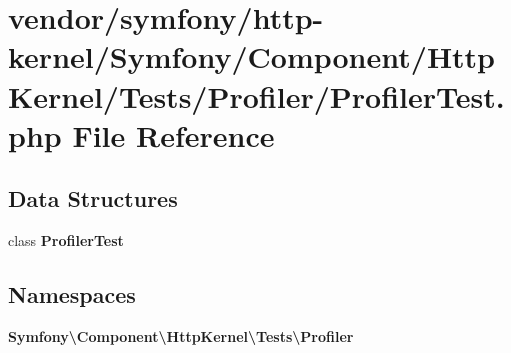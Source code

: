 \section{vendor/symfony/http-\/kernel/\+Symfony/\+Component/\+Http\+Kernel/\+Tests/\+Profiler/\+Profiler\+Test.php File Reference}
\label{_profiler_test_8php}
\subsection*{Data Structures}
\begin{DoxyCompactItemize}
\item 
class {\bf Profiler\+Test}
\end{DoxyCompactItemize}
\subsection*{Namespaces}
\begin{DoxyCompactItemize}
\item 
 {\bf Symfony\textbackslash{}\+Component\textbackslash{}\+Http\+Kernel\textbackslash{}\+Tests\textbackslash{}\+Profiler}
\end{DoxyCompactItemize}
